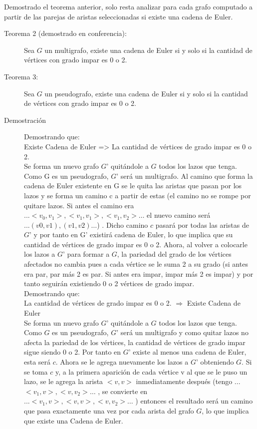 \documentclass[a4paper,12pt,twocolumn]{article}
\begin{document}
	
	
	
	Demostrado el teorema anterior, solo resta analizar para cada grafo computado a partir de las parejas de aristas seleccionadas si existe una cadena de Euler. \\
	
	\begin{description}
		\item[Teorema 2 (demostrado en conferencia):] Sea $G$ un multigrafo, existe una cadena de Euler si y solo si la cantidad de vértices con grado impar es 0 o 2.
	\end{description}
	
	\begin{description}
		\item[Teorema 3:] Sea $G$ un pseudografo, existe una cadena de Euler si y solo si la cantidad de vértices con grado impar es 0 o 2.
	\end{description} 
	
	\begin{description}
		\item[Demostración] Demostrando que: \\ Existe Cadena de Euler => La cantidad de vértices de grado impar es 0 o 2.\\
		Se forma un nuevo grafo $G’$ quitándole a $G$ todos los lazos que tenga. Como G es un pseudografo, $G’$ será un multigrafo. Al camino que forma la cadena de Euler existente en G se le quita las aristas que pasan por los lazos y se forma un camino c a partir de estas (el camino no se rompe por quitare lazos. Si antes el camino era $...<v_0,v_1>, <v_1, v_1>, <v_1, v_2>…$ el nuevo camino será $...(v0,v1), (v1, v2)…$) . Dicho camino $c$ pasará por todas las aristas de $G’$ y por tanto en G’ existirá cadena de Euler, lo que implica que su cantidad de vértices de grado impar es 0 o 2. Ahora, al volver a colocarle los lazos a $G’$ para formar a $G$, la pariedad del grado de los vértices afectados no cambia pues a cada vértice se le suma 2 a su grado (si antes era par, par más 2 es par. Si antes era impar, impar más 2 es impar) y por tanto seguirán existiendo 0 o 2 vértices de grado impar.\\
		
		Demostrando que: \\La cantidad de vértices de grado impar es 0 o 2. $\Rightarrow$ Existe Cadena de Euler\\
		Se forma un nuevo grafo $G’$ quitándole a $G$ todos los lazos que tenga. Como $G$ es un pseudografo, $G’$ será un multigrafo y como quitar lazos no afecta la pariedad de los vértices, la cantidad de vértices de grado impar sigue siendo 0 o 2. Por tanto en $G’$ existe al menos una cadena de Euler, esta será $c$. Ahora se le agrega nuevamente los lazos a $G’$ obteniendo $G$. Si se toma $c$ y, a la primera aparición de cada vértice v al que se le puso un lazo, se le agrega la arista $<v,v>$ inmediatamente después (tengo ...$<v_1, v>, <v, v_2>…$ , se convierte en $... <v_1, v>, <v, v>, <v, v_2>…$ ) entonces el resultado será un camino que pasa exactamente una vez por cada arista del grafo $G$, lo que implica que existe una Cadena de Euler.
	\end{description}
	
\end{document}
